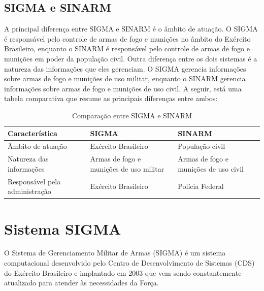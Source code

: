 \subsection{SIGMA e SINARM}\label{sigmaesinarm}
A principal diferença entre SIGMA e SINARM é o âmbito de atuação. O SIGMA é responsável pelo controle de armas de fogo e munições no âmbito do Exército Brasileiro, enquanto o SINARM é responsável pelo controle de armas de fogo e munições em poder da população civil.
Outra diferença entre os dois sistemas é a natureza das informações que eles gerenciam. O SIGMA gerencia informações sobre armas de fogo e munições de uso militar, enquanto o SINARM gerencia informações sobre armas de fogo e munições de uso civil.
A seguir, está uma tabela comparativa que resume as principais diferenças entre ambos: 
\begin{table}[ht]
	\centering
	\caption{Comparação entre SIGMA e SINARM}
	\begin{tabularx}{\textwidth}{lXp{5cm}}
	  \toprule
	  Característica & SIGMA & SINARM \\
	  \midrule
	  Âmbito de atuação & Exército Brasileiro & População civil \\
	  Natureza das informações & Armas de fogo e munições de uso militar & Armas de fogo e munições de uso civil \\
	  Responsável pela administração & Exército Brasileiro & Polícia Federal \\
	  \bottomrule
	\end{tabularx}
  \end{table}

  

\section{ Sistema SIGMA } 
O Sistema de Gerenciamento Militar de Armas (SIGMA) é um sistema computacional desenvolvido pelo Centro de Desenvolvimento de Sistemas (CDS) do Exército Brasileiro e  implantado em 2003 que vem sendo constantemente atualizado para atender às necessidades da Força.\cite{fenemeReunixE3oSobre}

